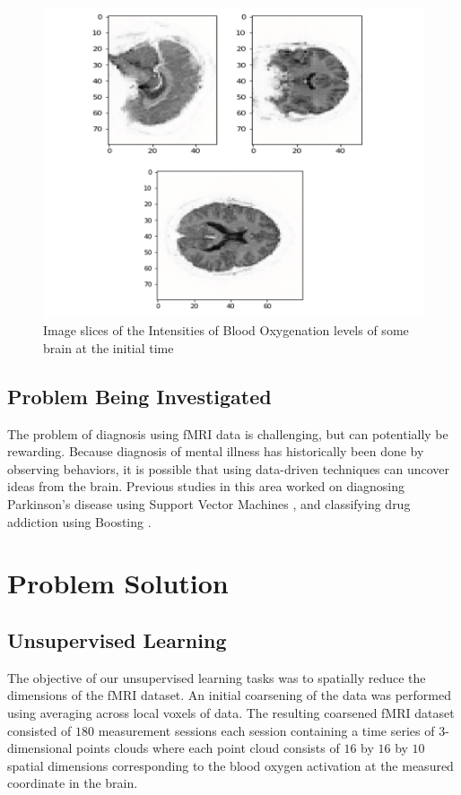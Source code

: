 \documentclass{article}[12pt]
\begin{document}
   \begin{figure}[!htb]
   	\centering
   	\includegraphics[scale=0.7]{brain_slices}
   	\caption{Image slices of the Intensities of Blood Oxygenation levels of some brain at the initial time}
   	\label{fig:brainSlice}
   \end{figure}
   
   \subsection{Problem Being Investigated}
   The problem of diagnosis using fMRI data is challenging, but can potentially be rewarding.  Because diagnosis of mental illness has historically been done by observing behaviors, it is possible that using data-driven techniques can uncover ideas from the brain.  Previous studies in this area worked on diagnosing Parkinson's disease using Support Vector Machines \cite{salvatore2014machine}, and classifying drug addiction using Boosting \cite{zhang2005diagnosis}.
   
   \section{Problem Solution}
   \subsection{Unsupervised Learning}
   The objective of our unsupervised learning tasks was to spatially reduce the dimensions of the fMRI dataset. An initial coarsening of the data was performed using averaging across local voxels of data. The resulting coarsened fMRI dataset consisted of $180$ measurement sessions each session containing a time series of $3$-dimensional points clouds where each point cloud consists of $16$ by $16$ by $10$ spatial dimensions corresponding to the blood oxygen activation at the measured coordinate in the brain.  
   
\end{document}
